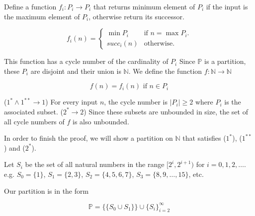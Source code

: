 \documentclass{article}
\begin{document}
    Define a function $f_i: P_i \to P_i$ that returns minimum element of $P_i$ if the input is the maximum element of $P_i$, otherwise return its successor.

    \begin{equation}
        \label{eq:func_sub}
        f_i(n)=
        \begin{cases}
            \min P_i &\text{if $n = \max P_i$}.\\
            succ_i(n) &\text{otherwise}.
        \end{cases}
    \end{equation}

    This function has a cycle number of the cardinality of $P_i$
    Since $\mathbb{P}$ is a partition, these $P_i$ are disjoint and their union is $\mathbb{N}$.
    We define the function $f: \mathbb{N} \to \mathbb{N}$

    \begin{equation}
        \label{eq:func}
        f(n)= f_i(n) \text{ if } n \in P_i
    \end{equation}

    ($1^* \land 1^{**} \to 1$) For every input $n$, the cycle number is $|P_i| \geq 2$ where $P_i$ is the associated subset. ($2^* \to 2$) Since these subsets are unbounded in size, the set of all cycle numbers of $f$ is also unbounded.

    In order to finish the proof, we will show a partition on $\mathbb{N}$ that satisfies ($1^*$), ($1^{**}$) and ($2^*$).

    Let $S_i$ be the set of all natural numbers in the range $[2^i, 2^{i+1})$ for $i=0, 1, 2, \dots$.
    e.g. $S_0 = \{ 1 \}$, $S_1 = \{ 2, 3 \}$, $S_2 = \{ 4 , 5, 6, 7 \}$, $S_3 = \{ 8, 9, \dots, 15 \}$, etc.

    Our partition is in the form

    \begin{equation}
        \label{eq:partition_concrete}
        \mathbb{P} = \{\{ S_0 \cup S_1 \}\} \cup \{ S_i \}_{i=2}^\infty
    \end{equation}
\end{document}
